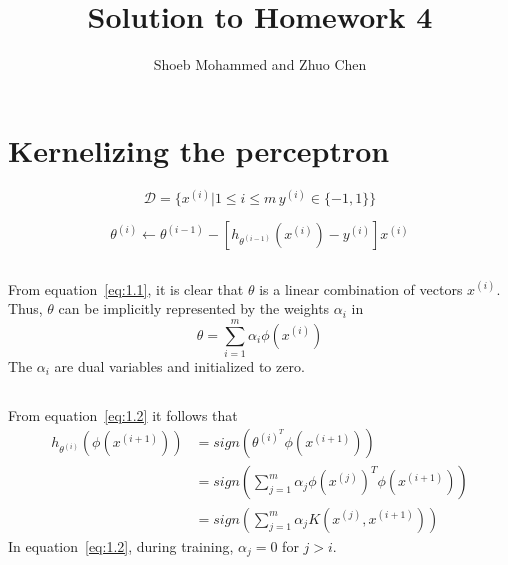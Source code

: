 \documentclass{article}
\begin{document}
\title{Solution to Homework 4}
\author{Shoeb Mohammed and Zhuo Chen}
\maketitle

\newcommand{\QEDA}{\hfill\ensuremath{\blacksquare}}
\newcommand{\QEDB}{\hfill\ensuremath{\square}}

\section{Kernelizing the perceptron}
\begin{equation*}
	\mathcal{D} = \{x^{(i)} | 1 \leq i \leq m\, y^{(i)} \in \{-1,1\}\} 
\end{equation*}

\begin{equation}
	\label{eq:1.1}
    \theta^{(i)} \leftarrow \theta^{(i-1)} - [h_{\theta^{(i-1)}}(x^{(i)}) - y^{(i)}]x^{(i)}
\end{equation}

\subsection{}
From equation~\ref{eq:1.1}, it is clear that $\theta$ is a linear combination of vectors $x^{(i)}$.
Thus, $\theta$ can be implicitly represented by the weights $\alpha_i$ in
\begin{equation}
	\label{eq:1.2}
    \theta = \sum_{i=1}^{m} \alpha_i \phi(x^{(i)})
\end{equation}
The $\alpha_i$ are dual variables and initialized to zero.

\subsection{}
From equation~\ref{eq:1.2} it follows that
\begin{equation}
  \label{eq:1.3}
  \begin{split}
  h_{\theta^{(i)}}(\phi(x^{(i+1)})) &= sign\left(\theta^{(i)^T}\phi(x^{(i+1)})\right) \\
                  &= sign\left(\sum_{j=1}^{m} \alpha_j \phi(x^{(j)})^T \phi(x^{(i+1)})\right) \\
				  &= sign\left(\sum_{j=1}^{m} \alpha_j K( x^{(j)}, x^{(i+1)} )\right)
  \end{split}
\end{equation}
In equation~\ref{eq:1.2}, during training, $\alpha_j = 0$ for $j > i$.
\end{document}
